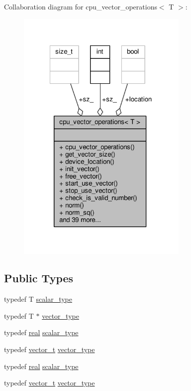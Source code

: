 Collaboration diagram for cpu\-\_\-vector\-\_\-operations$<$ T $>$\-:
\nopagebreak
\begin{figure}[H]
\begin{center}
\leavevmode
\includegraphics[width=233pt]{structcpu__vector__operations__coll__graph}
\end{center}
\end{figure}
\subsection*{Public Types}
\begin{DoxyCompactItemize}
\item 
typedef T \hyperlink{structcpu__vector__operations_aca6b216aa1fb172df83d98350e94fd61}{scalar\-\_\-type}
\item 
typedef T $\ast$ \hyperlink{structcpu__vector__operations_a1962836df596ce262704d208e9a6d8f9}{vector\-\_\-type}
\item 
typedef \hyperlink{linear__solvers__test_8cpp_a16870095f424ead722dee97d866cc328}{real} \hyperlink{structcpu__vector__operations_ab4a2755f01dbbf6deb948a4cf614eb14}{scalar\-\_\-type}
\item 
typedef \hyperlink{linear__solvers__test_8cpp_a8d0acf9490f363fba134e7c88d751014}{vector\-\_\-t} \hyperlink{structcpu__vector__operations_a8abfbd321d471a507c010da28fd97178}{vector\-\_\-type}
\item 
typedef \hyperlink{linear__solvers__test_8cpp_a16870095f424ead722dee97d866cc328}{real} \hyperlink{structcpu__vector__operations_ab4a2755f01dbbf6deb948a4cf614eb14}{scalar\-\_\-type}
\item 
typedef \hyperlink{linear__solvers__test_8cpp_a8d0acf9490f363fba134e7c88d751014}{vector\-\_\-t} \hyperlink{structcpu__vector__operations_a8abfbd321d471a507c010da28fd97178}{vector\-\_\-type}
\end{DoxyCompactItemize}
